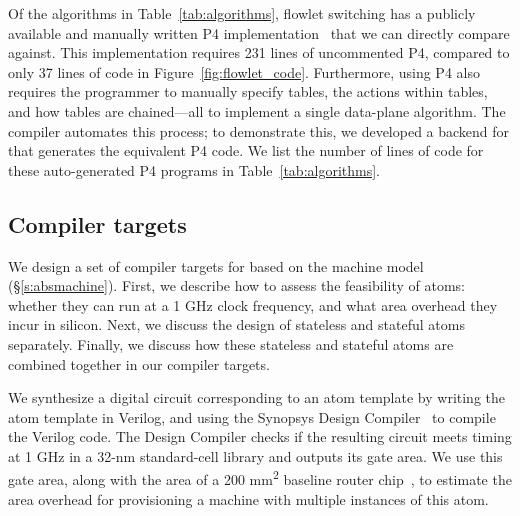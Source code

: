 Of the algorithms in Table~\ref{tab:algorithms}, flowlet switching has a
publicly available and manually written P4 implementation~\cite{p4_flowlet} that we can directly
compare against. This implementation requires 231 lines of uncommented P4,
compared to only 37 lines of \pktlanguage code in
Figure~\ref{fig:flowlet_code}. Furthermore, using P4 also requires the
programmer to manually specify tables, the actions within tables, and how
tables are chained---all to implement a single data-plane algorithm. The
\pktlanguage compiler automates this process; to demonstrate this, we developed
a backend for \pktlanguage that generates the equivalent P4 code. We list the
number of lines of code for these auto-generated P4 programs in
Table~\ref{tab:algorithms}.
\subsection{Compiler targets}
\label{ss:targets}

We design a set of compiler targets for \pktlanguage based on the \absmachine
machine model (\S\ref{s:absmachine}). First, we describe how to assess the
feasibility of atoms: whether they can run at a 1 GHz clock frequency, and what
area overhead they incur in silicon. Next, we discuss the design of stateless
and stateful atoms separately. Finally, we discuss how these stateless and
stateful atoms are combined together in our compiler targets.

We synthesize a digital circuit corresponding to an atom template by writing
the atom template in Verilog, and using the Synopsys Design
Compiler~\cite{synopsys_dc} to compile the Verilog code. The Design Compiler
checks if the resulting circuit meets timing at 1 GHz in a 32-nm standard-cell
library and outputs its gate area. We use this gate area, along with the area
of a 200 \si{\milli\metre\squared} baseline router chip~\cite{gibb_parsing}, to
estimate the area overhead for provisioning a \absmachine machine with multiple
instances of this atom.



